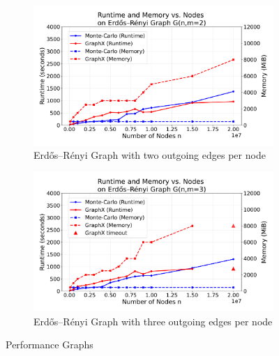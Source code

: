 \begin{figure}[H]
    \centering
    \begin{subfigure}[t]{0.5\linewidth}
        \centering
        \includegraphics[width=\linewidth]{images/plots/ER_2edg/combined_runtime_memory_vs_nodes_2edges_gx_mc.pdf}
        \caption{Erdős–Rényi Graph with two outgoing edges per node}
        \label{fig:wikigibhrs}
    \end{subfigure}
    \begin{subfigure}[t]{0.5\linewidth}
        \centering
        \includegraphics[width=\linewidth]{images/plots/ER_3edg/combined_runtime_memory_vs_nodes_3edges_gx_mc.pdf}
        \caption{Erdős–Rényi Graph with three outgoing edges per node}
        \label{fig:wikigibhrs}
    \end{subfigure}
    \caption{Performance Graphs}
    \label{fig:wiki-comparison}
\end{figure}



